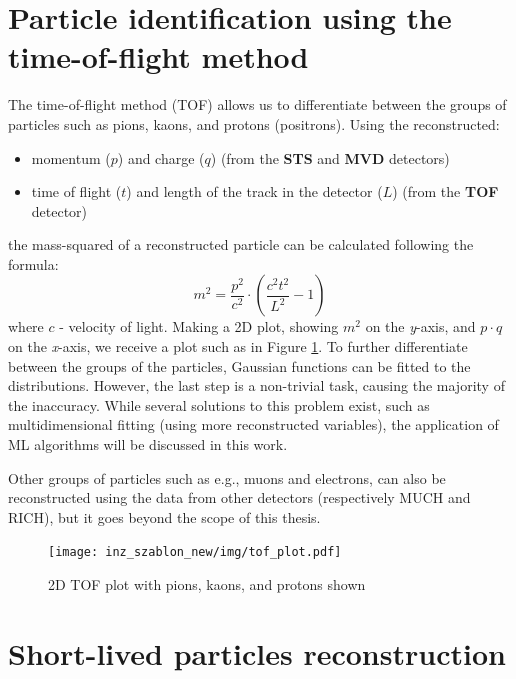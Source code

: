 \pagestyle{fancy}
\section{Particle identification using the time-of-flight method}\thispagestyle{fancy}

The time-of-flight method (TOF) allows us to differentiate between the groups of particles such as pions, kaons, and protons (positrons). Using the reconstructed:
\begin{itemize}
    \item momentum ($p$) and charge ($q$) (from the \textbf{STS} and \textbf{MVD} detectors) 
    \item time of flight ($t$) and length of the track in the detector ($L$) (from the \textbf{TOF} detector)
\end{itemize} the mass-squared of a reconstructed particle can be calculated following the formula:
\begin{equation}
    m^2 = \frac{p^2}{c^2} \cdot \left(\frac{c^2t^2}{L^2} - 1 \right)
    \label{msquared}
\end{equation}
where  $c$ - velocity of light. Making a 2D plot, showing $m^2$ on the \emph{y}-axis, and $p\cdot q$ on the \emph{x}-axis, we receive a plot such as in Figure \ref{tof plot}. To further differentiate between the groups of the particles, Gaussian functions can be fitted to the distributions. However, the last step is a non-trivial task, causing the majority of the inaccuracy. While several solutions to this problem exist, such as multidimensional fitting (using more reconstructed variables), the application of ML algorithms will be discussed in this work. 

Other groups of particles such as e.g., muons and electrons, can also be reconstructed using the data from other detectors (respectively MUCH and RICH), but it goes beyond the scope of this thesis.

\begin{figure}[H]
    \centering
    \texttt{[image: inz\_szablon\_new/img/tof\_plot.pdf]}
    \caption{2D TOF plot with pions, kaons, and protons shown}
    \label{tof plot}
\end{figure}
    

\section{Short-lived particles reconstruction}

